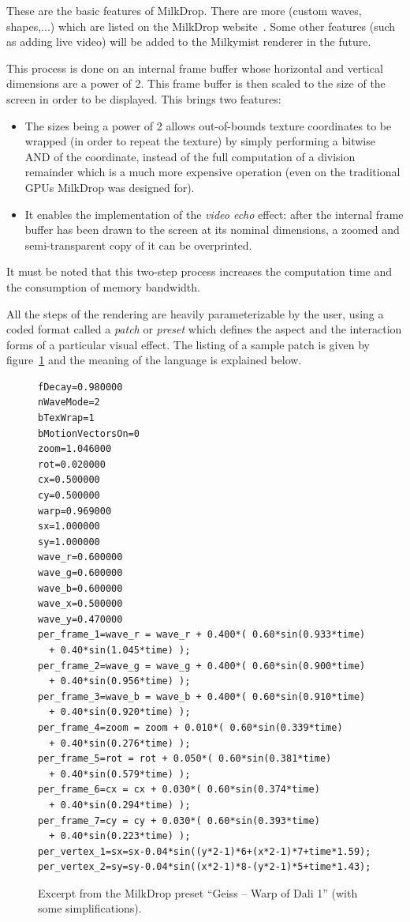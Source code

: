 \documentclass[a4paper,11pt]{kthesis}
\begin{document}
These are the basic features of MilkDrop. There are more (custom waves, shapes,...) which are listed on the MilkDrop website~\cite{milkdrop}. Some other features (such as adding live video) will be added to the Milkymist renderer in the future.

This process is done on an internal frame buffer whose horizontal and vertical dimensions are a power of 2. This frame buffer is then scaled to the size of the screen in order to be displayed. This brings two features:
\begin{itemize}
\item The sizes being a power of 2 allows out-of-bounds texture coordinates to be wrapped (in order to repeat the texture) by simply performing a bitwise AND of the coordinate, instead of the full computation of a division remainder which is a much more expensive operation (even on the traditional GPUs MilkDrop was designed for).
\item It enables the implementation of the \textit{video echo} effect: after the internal frame buffer has been drawn to the screen at its nominal dimensions, a zoomed and semi-transparent copy of it can be overprinted.
\end{itemize}
It must be noted that this two-step process increases the computation time and the consumption of memory bandwidth.

All the steps of the rendering are heavily parameterizable by the user, using a coded format called a \textit{patch} or \textit{preset} which defines the aspect and the interaction forms of a particular visual effect. The listing of a sample patch is given by figure~\ref{fig:samplepatch} and the meaning of the language is explained below.

\begin{figure}
\centering
\begin{boxedminipage}{13cm}
\begin{verbatim}
fDecay=0.980000
nWaveMode=2
bTexWrap=1
bMotionVectorsOn=0
zoom=1.046000
rot=0.020000
cx=0.500000
cy=0.500000
warp=0.969000
sx=1.000000
sy=1.000000
wave_r=0.600000
wave_g=0.600000
wave_b=0.600000
wave_x=0.500000
wave_y=0.470000
per_frame_1=wave_r = wave_r + 0.400*( 0.60*sin(0.933*time)
  + 0.40*sin(1.045*time) );
per_frame_2=wave_g = wave_g + 0.400*( 0.60*sin(0.900*time)
  + 0.40*sin(0.956*time) );
per_frame_3=wave_b = wave_b + 0.400*( 0.60*sin(0.910*time)
  + 0.40*sin(0.920*time) );
per_frame_4=zoom = zoom + 0.010*( 0.60*sin(0.339*time)
  + 0.40*sin(0.276*time) );
per_frame_5=rot = rot + 0.050*( 0.60*sin(0.381*time)
  + 0.40*sin(0.579*time) );
per_frame_6=cx = cx + 0.030*( 0.60*sin(0.374*time)
  + 0.40*sin(0.294*time) );
per_frame_7=cy = cy + 0.030*( 0.60*sin(0.393*time)
  + 0.40*sin(0.223*time) );
per_vertex_1=sx=sx-0.04*sin((y*2-1)*6+(x*2-1)*7+time*1.59);
per_vertex_2=sy=sy-0.04*sin((x*2-1)*8-(y*2-1)*5+time*1.43);
\end{verbatim}
\end{boxedminipage}
\caption{Excerpt from the MilkDrop preset ``Geiss -- Warp of Dali 1'' (with some simplifications).}
\label{fig:samplepatch}
\end{figure}
\end{document}
